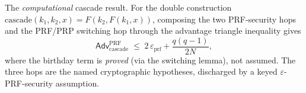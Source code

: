 \begin{theorem}
  \label{thm:cascade-prf}
  \leanok
  The \emph{computational} cascade result. For the double construction
  $\mathrm{cascade}(k_1, k_2, x) = F(k_2, F(k_1, x))$, composing the two
  PRF-security hops and the PRF/PRP switching hop through the advantage triangle
  inequality gives
  \[
    \mathsf{Adv}^{\mathrm{PRF}}_{\mathrm{cascade}} \;\le\; 2\,\varepsilon_{\mathrm{prf}}
    + \frac{q(q-1)}{2N},
  \]
  where the birthday term is \emph{proved} (via the switching lemma), not assumed.
  The three hops are the named cryptographic hypotheses, discharged by a keyed
  $\varepsilon$-PRF-security assumption.
\end{theorem}
